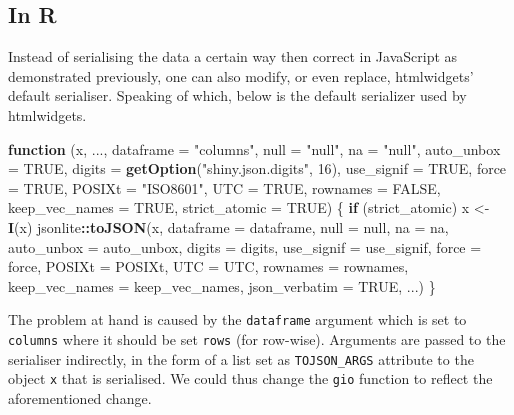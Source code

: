 \documentclass[
]{krantz}
\makeatletter
\newenvironment{Shaded}{\begin{snugshade}}{\end{snugshade}}
\newcommand{\ControlFlowTok}[1]{\textcolor[rgb]{0.27,0.27,0.27}{\textbf{#1}}}
\newcommand{\DataTypeTok}[1]{\textcolor[rgb]{0.27,0.27,0.27}{#1}}
\newcommand{\DecValTok}[1]{\textcolor[rgb]{0.06,0.06,0.06}{#1}}
\newcommand{\KeywordTok}[1]{\textcolor[rgb]{0.27,0.27,0.27}{\textbf{#1}}}
\newcommand{\NormalTok}[1]{#1}
\newcommand{\OperatorTok}[1]{\textcolor[rgb]{0.43,0.43,0.43}{\textbf{#1}}}
\newcommand{\OtherTok}[1]{\textcolor[rgb]{0.37,0.37,0.37}{#1}}
\newcommand{\StringTok}[1]{\textcolor[rgb]{0.5,0.5,0.5}{#1}}
\newenvironment{kframe}{%
\medskip{}
\setlength{\fboxsep}{.8em}
 \def\at@end@of@kframe{}%
 \ifinner\ifhmode%
  \def\at@end@of@kframe{\end{minipage}}%
  \begin{minipage}{\columnwidth}%
 \fi\fi%
 \def\FrameCommand##1{\hskip\@totalleftmargin \hskip-\fboxsep
 \colorbox{shadecolor}{##1}\hskip-\fboxsep
     \hskip-\linewidth \hskip-\@totalleftmargin \hskip\columnwidth}%
 \MakeFramed {\advance\hsize-\width
   \@totalleftmargin\z@ \linewidth\hsize
   \@setminipage}}%
 {\par\unskip\endMakeFramed%
 \at@end@of@kframe}
\renewenvironment{Shaded}{\begin{kframe}}{\end{kframe}}
\makeatother
\begin{document}
\hypertarget{in-r}{%
\subsection*{In R}\label{in-r}}


Instead of serialising the data a certain way then correct in JavaScript as demonstrated previously, one can also modify, or even replace, htmlwidgets' default serialiser. Speaking of which, below is the default serializer used by htmlwidgets.

\begin{Shaded}
\begin{Highlighting}[]
\ControlFlowTok{function}\NormalTok{ (x, ..., }\DataTypeTok{dataframe =} \StringTok{"columns"}\NormalTok{, }\DataTypeTok{null =} \StringTok{"null"}\NormalTok{, }\DataTypeTok{na =} \StringTok{"null"}\NormalTok{, }
  \DataTypeTok{auto\_unbox =} \OtherTok{TRUE}\NormalTok{, }\DataTypeTok{digits =} \KeywordTok{getOption}\NormalTok{(}\StringTok{"shiny.json.digits"}\NormalTok{, }\DecValTok{16}\NormalTok{), }
  \DataTypeTok{use\_signif =} \OtherTok{TRUE}\NormalTok{, }\DataTypeTok{force =} \OtherTok{TRUE}\NormalTok{, }\DataTypeTok{POSIXt =} \StringTok{"ISO8601"}\NormalTok{, }\DataTypeTok{UTC =} \OtherTok{TRUE}\NormalTok{, }
  \DataTypeTok{rownames =} \OtherTok{FALSE}\NormalTok{, }\DataTypeTok{keep\_vec\_names =} \OtherTok{TRUE}\NormalTok{, }\DataTypeTok{strict\_atomic =} \OtherTok{TRUE}\NormalTok{) }
\NormalTok{\{}
  \ControlFlowTok{if}\NormalTok{ (strict\_atomic) }
\NormalTok{      x \textless{}{-}}\StringTok{ }\KeywordTok{I}\NormalTok{(x)}
\NormalTok{  jsonlite}\OperatorTok{::}\KeywordTok{toJSON}\NormalTok{(x, }\DataTypeTok{dataframe =}\NormalTok{ dataframe, }\DataTypeTok{null =}\NormalTok{ null, }\DataTypeTok{na =}\NormalTok{ na, }
    \DataTypeTok{auto\_unbox =}\NormalTok{ auto\_unbox, }\DataTypeTok{digits =}\NormalTok{ digits, }\DataTypeTok{use\_signif =}\NormalTok{ use\_signif, }
    \DataTypeTok{force =}\NormalTok{ force, }\DataTypeTok{POSIXt =}\NormalTok{ POSIXt, }\DataTypeTok{UTC =}\NormalTok{ UTC, }\DataTypeTok{rownames =}\NormalTok{ rownames, }
    \DataTypeTok{keep\_vec\_names =}\NormalTok{ keep\_vec\_names, }\DataTypeTok{json\_verbatim =} \OtherTok{TRUE}\NormalTok{, ...)}
\NormalTok{\}}
\end{Highlighting}
\end{Shaded}

The problem at hand is caused by the \texttt{dataframe} argument which is set to \texttt{columns} where it should be set \texttt{rows} (for row-wise). Arguments are passed to the serialiser indirectly, in the form of a list set as \texttt{TOJSON\_ARGS} attribute to the object \texttt{x} that is serialised. We could thus change the \texttt{gio} function to reflect the aforementioned change.
\end{document}

